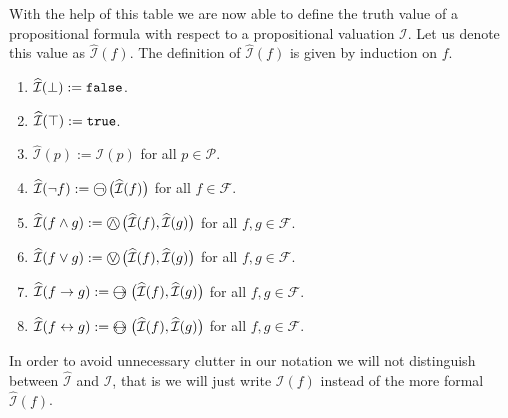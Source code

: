 \begin{table}[!ht]
  \centering
{}
  \caption{Interpretation of the logical connectives.}
  \label{tab:aussagen-logik}
\end{table}
With the help of this table we are now able to define the truth value of a propositional formula
with respect to a propositional valuation $\mathcal{I}$.  Let us denote this value as 
$\widehat{\mathcal{I}}(f)$.  The definition of $\widehat{\mathcal{I}}(f)$ is given by induction on $f$.
\begin{enumerate}
\item $\widehat{\mathcal{I}}(\bot) := \mathtt{false}$.
\item $\widehat{\mathcal{I}}(\top) := \mathtt{true}$.
\item $\widehat{\mathcal{I}}(p) := \mathcal{I}(p)$ for all $p \in \mathcal{P}$.
\item $\widehat{\mathcal{I}}(\neg f) := \circneg\;\bigl(\widehat{\mathcal{I}}(f)\bigr)$ for all $f \in \mathcal{F}$.
\item $\widehat{\mathcal{I}}(f \wedge g) := \circwedge\;\bigl(\widehat{\mathcal{I}}(f), \widehat{\mathcal{I}}(g)\bigr)$ 
      for all $f, g \in \mathcal{F}$.
\item $\widehat{\mathcal{I}}(f \vee g) := \circvee\;\bigl(\widehat{\mathcal{I}}(f), \widehat{\mathcal{I}}(g)\bigr)$ 
      for all $f, g \in \mathcal{F}$.
\item $\widehat{\mathcal{I}}(f \rightarrow g) := \circright\;\bigl(\widehat{\mathcal{I}}(f), \widehat{\mathcal{I}}(g)\bigr)$ 
      for all $f, g \in \mathcal{F}$.
\item $\widehat{\mathcal{I}}(f \leftrightarrow g) := \circleftright\;\bigl(\widehat{\mathcal{I}}(f), \widehat{\mathcal{I}}(g)\bigr)$ 
      for all $f, g \in \mathcal{F}$.
\end{enumerate}
In order to avoid unnecessary clutter in our notation we will not distinguish between
$\widehat{\mathcal{I}}$ and $\mathcal{I}$, that is we will just write $\mathcal{I}(f)$ instead of
the more formal $\widehat{\mathcal{I}}(f)$.

